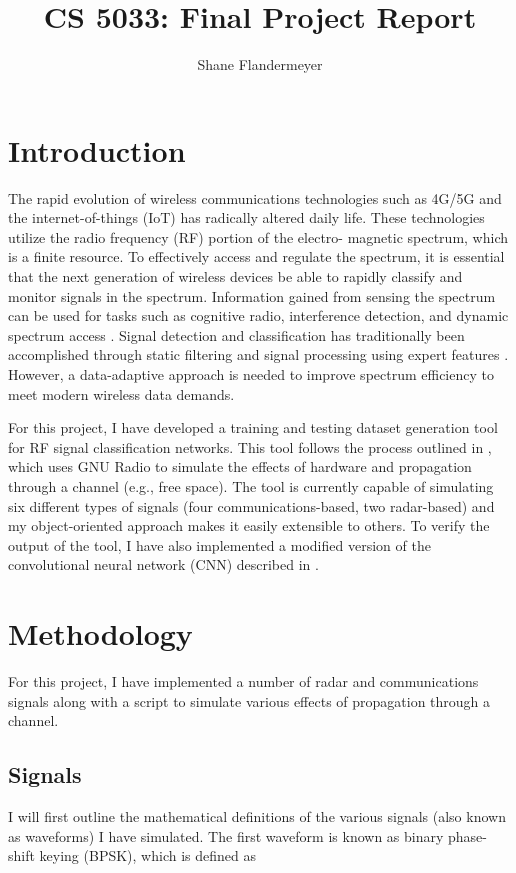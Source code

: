 \documentclass{article}
\title{CS 5033: Final Project Report}
\author{Shane Flandermeyer}
\date{}
\begin{document}
\maketitle

\section{Introduction}

The rapid evolution of wireless communications technologies such as 4G/5G and the internet-of-things (IoT)
has radically altered daily life. These technologies utilize the radio frequency (RF) portion of the electro-
magnetic spectrum, which is a finite resource. To effectively access and regulate the spectrum, it is essential
that the next generation of wireless devices be able to rapidly classify and monitor signals in the spectrum.
Information gained from sensing the spectrum can be used for tasks such as cognitive radio, interference
detection, and dynamic spectrum access \cite{Kulin2018}. Signal
detection and classification has traditionally been accomplished through static filtering and
signal processing using expert features \cite{Ariananda2009}. However, a
data-adaptive approach is needed to improve spectrum efficiency to meet modern
wireless data demands.

For this project, I have developed a training and testing dataset generation
tool for RF signal classification networks. This tool follows the process outlined
in \cite{OShea2016}, which uses GNU Radio to simulate the effects of hardware
and propagation through a channel (e.g., free space). The tool is currently
capable of simulating six different types of signals (four
communications-based, two radar-based) and my object-oriented approach makes it
easily extensible to others. To verify the output of the tool, I have also
implemented a modified version of the convolutional neural network (CNN)
described in \cite{OShea2016a}.


\section{Methodology}

For this project, I have implemented a number of radar and communications
signals along with a script to simulate various effects of propagation through a
channel. 
\subsection{Signals}
I will first outline the mathematical definitions of the
various signals (also known as waveforms) I have simulated. The first waveform is
known as binary phase-shift keying (BPSK), which is defined as 
\end{document}
